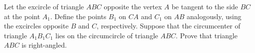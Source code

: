 Let the excircle of triangle $ABC$ opposite
the vertex $A$ be tangent to the side $BC$ at the point $A_1$.
Define the points $B_1$ on $CA$ and $C_1$ on $AB$ analogously,
using the excircles opposite $B$ and $C$, respectively.
Suppose that the circumcenter of triangle $A_1B_1C_1$ lies
on the circumcircle of triangle $ABC$.
Prove that triangle $ABC$ is right-angled.